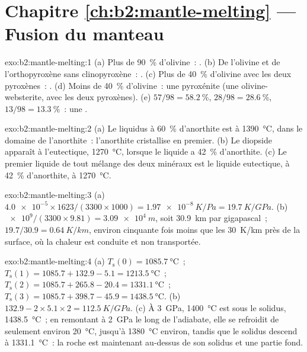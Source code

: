 \section*{Chapitre \ref{ch:b2:mantle-melting} --- Fusion du manteau}

\begin{solution}{exo:b2:mantle-melting:1}
(a) Plus de \qty{90}{\percent} d'olivine~: . (b) De l'olivine et de l'orthopyroxène
sans clinopyroxène~: . (c) Plus de \qty{40}{\percent} d'olivine avec
les deux pyroxènes~: . (d) Moins de \qty{40}{\percent} d'olivine~: une pyroxénite
(une olivine-websterite, avec les deux pyroxènes). (e) $57/98 = \qty{58.2}{\percent}$,
$28/98 = \qty{28.6}{\percent}$, $13/98 = \qty{13.3}{\percent}$~: une .
\end{solution}

\begin{solution}{exo:b2:mantle-melting:2}
(a) Le liquidus à \qty{60}{\percent} d'anorthite est à \qty{1390}{\celsius}, dans le domaine
de l'anorthite~: l'anorthite cristallise en premier. (b) Le diopside apparaît à
l'eutectique, \qty{1270}{\celsius}, lorsque le liquide a \qty{42}{\percent} d'anorthite.
(c) Le premier liquide de tout mélange des deux minéraux est le liquide eutectique,
à \qty{42}{\percent} d'anorthite, à \qty{1270}{\celsius}.
\end{solution}

\begin{solution}{exo:b2:mantle-melting:3}
(a) $\num{4.0e-5}\times1623/(3300\times1000) = \qty{1.97e-8}{K/Pa} =
\qty{19.7}{K/GPa}$. (b) $\num{e9}/(3300\times9.81) = \qty{3.09e4}{m}$, soit
\qty{30.9}{km} par gigapascal~; $19.7/30.9 = \qty{0.64}{K/km}$, environ cinquante fois
moins que les \qty{30}{K/km} près de la surface, où la chaleur est conduite et non
transportée.
\end{solution}

\begin{solution}{exo:b2:mantle-melting:4}
(a) $T_{\mathrm s}(0) = \qty{1085.7}{\celsius}$~; $T_{\mathrm s}(1) = 1085.7 +
132.9 - 5.1 = \qty{1213.5}{\celsius}$~; $T_{\mathrm s}(2) = 1085.7 + 265.8 - 20.4 =
\qty{1331.1}{\celsius}$~; $T_{\mathrm s}(3) = 1085.7 + 398.7 - 45.9 =
\qty{1438.5}{\celsius}$. (b) $132.9 - 2\times5.1\times2 = \qty{112.5}{K/GPa}$.
(c) À \qty{3}{GPa}, \qty{1400}{\celsius} est sous le solidus,
\qty{1438.5}{\celsius}~; en remontant à \qty{2}{GPa} le long de l'adiabate, elle se refroidit de
seulement environ \qty{20}{\celsius}, jusqu'à \qty{1380}{\celsius} environ, tandis que le solidus descend à
\qty{1331.1}{\celsius}~: la roche est maintenant au-dessus de son solidus et une partie fond.
\end{solution}

